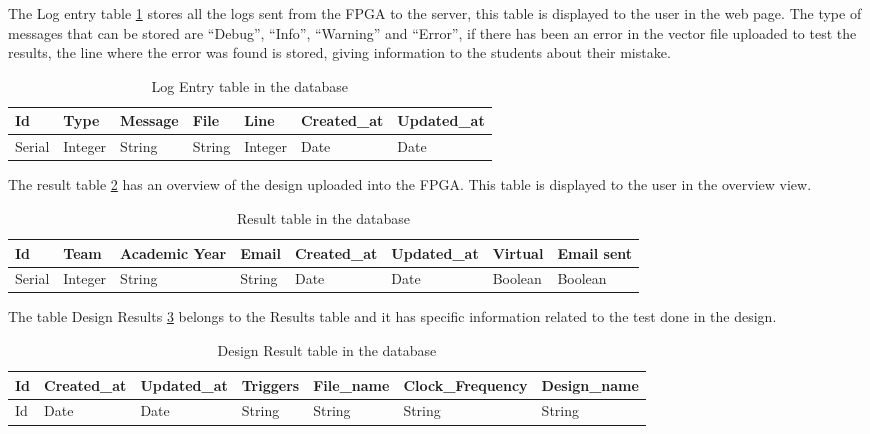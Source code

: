 The Log entry table \ref{tab:log_entry_table} stores all the logs sent from the FPGA to the server, this table is displayed to the user in the web page. The type of messages that can be stored are ``Debug'', ``Info'', ``Warning'' and ``Error'',
if there has been an error in the vector file uploaded to test the results, the line where the error was found is stored, giving information to the students about their mistake.

\begin{table}[h!]
\centering
    \begin{tabular}{ | l | l | l | l | l | l | l |}
    \hline
    Id & Type & Message & File & Line & Created\_at & Updated\_at  \\ \hline
    Serial & Integer & String & String & Integer & Date & Date \\ \hline
    \end{tabular}
    \caption{Log Entry table in the database}
    \label{tab:log_entry_table}
\end{table}

The result table \ref{tab:Result_table} has an overview of the design uploaded into the FPGA. This table is displayed to the user in the overview view.

\begin{table}[h!]
\centering
    \begin{tabular}{ | l | l | l | l | l | l | l | l |}
    \hline
    Id & Team & Academic Year & Email & Created\_at & Updated\_at & Virtual & Email sent \\ \hline
    Serial & Integer & String & String & Date & Date & Boolean & Boolean\\ \hline
    \end{tabular}
    \caption{Result table in the database}
    \label{tab:Result_table}
\end{table}

The table Design Results \ref{tab:design_result_table} belongs to the Results table and it has specific information related to the test done in the design.

\begin{table}[h!]
\centering
    \begin{tabular}{ | l | l | l | l | l | l | l |}
    \hline
    Id & Created\_at & Updated\_at & Triggers & File\_name & Clock\_Frequency & Design\_name  \\ \hline
    Id & Date & Date & String & String & String & String \\ \hline
    \end{tabular}
    \caption{Design Result table in the database}
    \label{tab:design_result_table}
\end{table}

